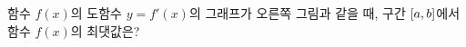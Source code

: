 \noindent\begin{minipage}[t]{0.58\linewidth}\vspace{0pt}\raggedright 함수 $f(x)$의 도함수 $y=f'(x)$의 그래프가 오른쪽 그림과 같을 때, 구간 $[a{,}\mkern3mu\mathopen{}b]$에서 함수 $f(x)$의 최댓값은?\end{minipage}\hfill\begin{minipage}[t]{0.4\linewidth}\vspace{0pt}\centering \resizebox{\ifdim\width>\linewidth\linewidth\else\width\fi}{!}{}\end{minipage}\par
{}
